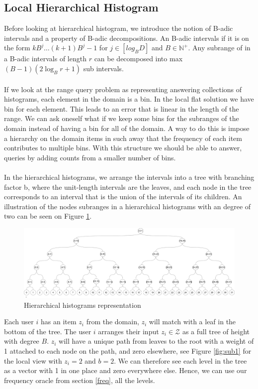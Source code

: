 \documentclass[11pt]{article}
\theoremstyle{definition}
\begin{document}
\subsection{Local Hierarchical Histogram}
Before looking at hierarchical histogram, we introduce the notion of B-adic intervals and a property of B-adic decompositions. An B-adic intervals if it is on the form  $k B^{j} \ldots(k+1) B^{j}-1$ for $j\in [log_BD]$ and $B\in\mathbb{N}^+$. Any subrange of in a B-adic intervals of length $r$  can be decomposed into max  $(B-1)\left(2 \log _{B} r+1\right)$ sub intervals. \\ \\
If we look at the range query problem as representing answering collections of histograms, each element in the domain is a bin. In the local flat solution we have bin for each element. This leads to an error that is linear in the length of the range. We can ask oneself what if we keep some bins for the subranges of the domain instead of having a bin for all of the domain. A way to do this is impose a hierarchy on the domain items in such away that the frequency of each item contributes to multiple bins. With this structure we should be able to answer, queries by adding counts from a smaller number of bins. \\ \\
In the hierarchical histograms, we arrange the intervals into a tree with branching factor b, where the unit-length intervals are the leaves, and each node in the tree corresponds to an interval that is the union of the intervals of its children. An illustration of the nodes subranges in a hierarchical histograms with an degree of two can be seen on Figure \ref{fig:disjoint}.
\begin{figure}[H]
    \centering
    \includegraphics[width=.8\linewidth]{figures/disjoint_tree.png}
    \caption{Hierarchical histograms representation}
    \label{fig:disjoint}
\end{figure}
Each user $i$ has an item $z_i$ from the domain, $z_i$ will match with a leaf in the bottom of the tree. The user $i$ arranges their input $z_i\in \mathcal{Z}$ as a full tree of height with degree $B$. $z_i$ will have a unique path from leaves to the root with a weight of 1 attached to each node on the path, and zero elsewhere, see Figure \ref{fig:sub1} for the local view with  $z_i=2$ and $b=2$.  We can therefore see each level in the tree as a vector with 1 in one place and zero everywhere else. Hence, we can use our frequency oracle from section \ref{freq}, all the levels.  \\ \\
\end{document}
